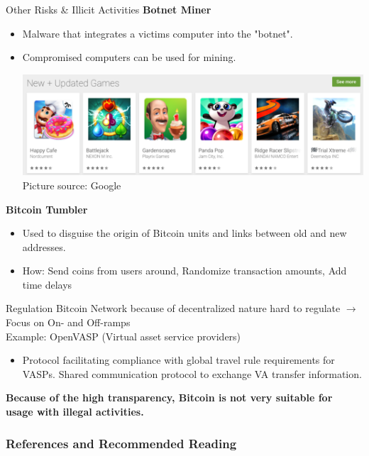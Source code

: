 \documentclass[handout]{beamer}
\begin{document}
\begin{frame}{Other Risks \& Illicit Activities}
	\textbf{Botnet Miner}
		\begin{itemize}
			\item Malware that integrates a victims computer into the "botnet".
			\item Compromised computers can be used for mining.
		\begin{center}
		\includegraphics[scale=0.25]{../assets/images/google_playstore}\\
		\footnotesize{Picture source: Google}
		\end{center}
		\end{itemize}
	\textbf{Bitcoin Tumbler}
		\begin{itemize}
			\item Used to disguise the origin of Bitcoin units and links between old and new addresses.
			\item How: Send coins from users around, Randomize transaction amounts, Add time delays
		\end{itemize}	
\end{frame}


\begin{frame}{Regulation}
	Bitcoin Network because of decentralized nature hard to regulate $\rightarrow$ Focus on On- and Off-ramps\\
	\vspace{1em}
	Example: {\color{focus} OpenVASP } (Virtual asset service providers)
		\begin{itemize}
			\item Protocol facilitating compliance with global travel rule requirements for VASPs. Shared communication protocol to exchange VA transfer information.
		\end{itemize}
	\vspace{1em}
	\textbf{Because of the high transparency, Bitcoin is not very suitable for usage with illegal activities.}
\end{frame}

\begin{frame}%
\frametitle{References and Recommended Reading}
	
	
\end{frame}
\end{document}
